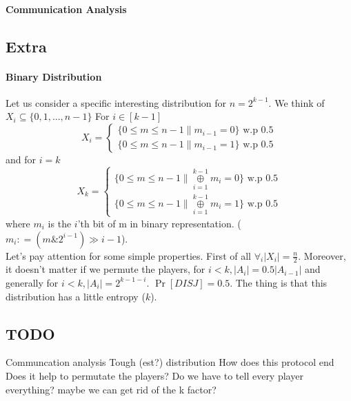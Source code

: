 \documentclass{article}
\begin{document}
\paragraph{Communication Analysis}
\subsection{Extra}
\paragraph{Binary Distribution}
Let us consider a specific interesting distribution for $n = 2^{k-1}$. We think of $X_i \subseteq \{0, 1, ... , n-1\} $ \newline
For $i \in [k-1]$
  \[
    X_i=\left\{
                \begin{array}{ll}
                  \{0 \leq m \leq n-1 \| m_{i-1} = 0\} \text{ w.p 0.5} \\
                  \{0 \leq m \leq n-1 \| m_{i-1} = 1\} \text{ w.p 0.5}
                \end{array}
              \right.
  \]
and for $i = k$
  \[
    X_k=\left\{
                \begin{array}{ll}
                  \{0 \leq m \leq n-1 \| \underset{i=1}{\overset{k-1}{\oplus}} m_i = 0\} \text{ w.p 0.5} \\
                  \{0 \leq m \leq n-1 \| \underset{i=1}{\overset{k-1}{\oplus}} m_i = 1\} \text{ w.p 0.5}
                \end{array}
              \right.
  \]
where $m_i$ is the $i$'th bit of m in binary representation. ($m_i \mathrel{\mathop:}= ( m \mathop{\&} 2^{i-1} ) \gg i-1 $). \\
Let's pay attention for some simple properties. First of all $\forall_i |X_i| = \frac{n}{2}$. Moreover, it doesn't matter if we permute the players, for $i < k, |A_i| = 0.5|A_{i-1}|$ and generally for $i < k, |A_i| = 2^{k-1-i}$. $\Pr[DISJ] = 0.5$. The thing is that this distribution has a little entropy ($k$). 
\subsection{TODO}
Communcation analysis \newline
Tough (est?) distribution\newline
How does this protocol end \newline
Does it help to permutate the players? \newline
Do we have to tell every player everything? maybe we can get rid of the k factor? \newline
\end{document}
